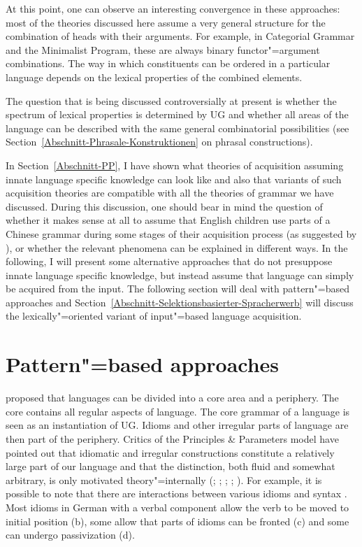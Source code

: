 At this point, one can observe an interesting convergence in these approaches: most of the theories discussed here assume a very
general structure for the combination of heads with their arguments. For example, in Categorial Grammar and the Minimalist Program,
these are always binary functor"=argument combinations. The way in which constituents can be ordered in a particular language depends
on the lexical properties of the combined elements.

The question that is being discussed controversially at present is whether the spectrum of lexical properties is determined by UG 
\citep[--7]{Chomsky2007a} and whether all areas of the language can be described with the same general combinatorial possibilities (see Section~\ref{Abschnitt-Phrasale-Konstruktionen} on phrasal constructions).

In Section~\ref{Abschnitt-PP}, I have shown what theories of acquisition assuming innate language
specific knowledge can look like and also that variants of such acquisition theories are compatible
with all the theories of grammar we have discussed.  During this discussion, one should bear in
 mind the question of whether it makes sense at all to assume that English children
use parts of a Chinese grammar during some stages of their acquisition process (as suggested by
\citet[]{Yang2004a}), or whether the relevant phenomena can be explained in different ways.
In the following, I will present some alternative approaches that do not presuppose innate language
specific knowledge, but instead assume that language can simply be acquired from the input. The
following section will deal with pattern"=based approaches and
Section~\ref{Abschnitt-Selektionsbasierter-Spracherwerb} will discuss the lexically"=oriented variant
of input"=based language acquisition.

\section{Pattern"=based approaches}
\label{Abschnitt-musterbasiert}

\mbox{}\citet[--8]{Chomsky81a} proposed that languages can be divided into a core
area and a periphery. The core contains all regular aspects of
language. The core grammar of a language is seen as an instantiation of UG. Idioms and
other irregular parts of language are then part of the periphery.  Critics of the Principles \&
Parameters model have pointed out that idiomatic and irregular constructions constitute a relatively
large part of our language and that the distinction, both fluid and somewhat arbitrary, is only
motivated theory"=internally (\citealp[Chapter~7]{Jackendoff97a}; \citealp{Culicover99a-u};
\citealp[]{GSag2000a-u}; \citealp[]{Newmeyer2005a}; \citealp[]{Kuhn2007a}).
For example, it is possible to note that there are interactions between various idioms and syntax
\citep*{NSW94a}.  Most idioms in German with a verbal component allow the verb to be moved to
initial position (b), some allow that parts of idioms can be fronted (c) and some can
undergo passivization (d).

